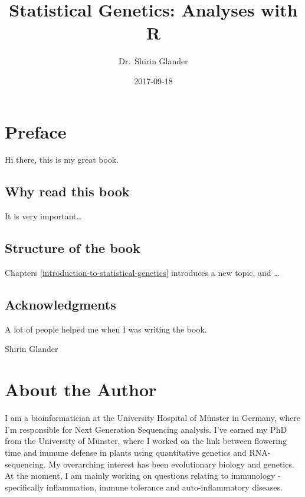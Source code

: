 \documentclass[12pt,]{krantz}
\title{Statistical Genetics: Analyses with R}
\author{Dr.~Shirin Glander}
\date{2017-09-18}
\theoremstyle{definition}
\theoremstyle{definition}
\theoremstyle{definition}
\theoremstyle{remark}
\let\BeginKnitrBlock\begin \let\EndKnitrBlock\end
\begin{document}
\maketitle

\pagestyle{empty}\cleardoublepage\newpage

\frontmatter

{
\hypersetup{linkcolor=black}
\setcounter{tocdepth}{1}
\tableofcontents
}
\listoftables
\listoffigures
\chapter*{Preface}\label{preface}


Hi there, this is my great book.

\section*{Why read this book}\label{why-read-this-book}


It is very important\ldots{}

\section*{Structure of the book}\label{structure-of-the-book}


Chapters \ref{introduction-to-statistical-genetics} introduces a new
topic, and \ldots{}

\section*{Acknowledgments}\label{acknowledgments}


A lot of people helped me when I was writing the book.

\BeginKnitrBlock{flushright}
Shirin Glander
\EndKnitrBlock{flushright}

\chapter*{About the Author}\label{about-the-author}


I am a bioinformatician at the University Hospital of Münster in
Germany, where I'm responsible for Next Generation Sequencing analysis.
I've earned my PhD from the University of Münster, where I worked on the
link between flowering time and immune defense in plants using
quantitative genetics and RNA-sequencing. My overarching interest has
been evolutionary biology and genetics. At the moment, I am mainly
working on questions relating to immunology - specifically inflammation,
immune tolerance and auto-inflammatory diseases.
\end{document}

